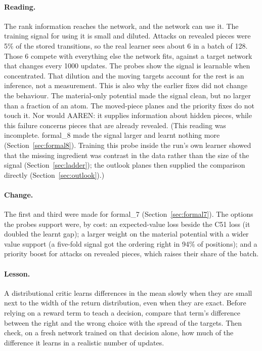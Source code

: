 \paragraph{Reading.} The rank information reaches the network, and the network can use it. The
training signal for using it is small and diluted. Attacks on revealed pieces were 5\% of the stored
transitions, so the real learner sees about 6 in a batch of 128. Those 6 compete with everything
else the network fits, against a target network that changes every 1000 updates. The probes show
the signal is learnable when concentrated. That dilution and the moving targets account for the
rest is an inference, not a measurement. This is also why the earlier fixes did not change the
behaviour. The material-only potential made the signal clean, but no larger than a fraction of an
atom. The moved-piece planes and the priority fixes do not touch it. Nor would AAREN: it supplies
information about hidden pieces, while this failure concerns pieces that are already revealed.
(This reading was incomplete. formal\_8 made the signal larger and learnt nothing more
(Section~\ref{sec:formal8}). Training this probe inside the run's own learner showed that the
missing ingredient was contrast in the data rather than the size of the signal
(Section~\ref{sec:ladder}); the outlook planes then supplied the comparison directly
(Section~\ref{sec:outlook}).)

\paragraph{Change.} The first and third were made for formal\_7 (Section~\ref{sec:formal7}). The
options the probes support were, by cost: an expected-value loss beside the C51 loss (it doubled
the learnt gap); a larger weight on the material potential with a wider value support (a five-fold
signal got the ordering right in 94\% of positions); and a priority boost for attacks on revealed
pieces, which raises their share of the batch.

\paragraph{Lesson.} A distributional critic learns differences in the mean slowly when they are
small next to the width of the return distribution, even when they are exact. Before relying on
a reward term to teach a decision, compare that term's difference between the right and the wrong
choice with the spread of the targets. Then check, on a fresh network trained on that decision
alone, how much of the difference it learns in a realistic number of updates.

